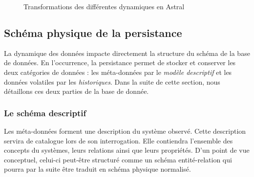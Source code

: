 \begin{figure}[ht]
    \centering
{}
\caption{Transformations des différentes dynamiques en Astral}\label{fig:contrib:asteroid:theorie:dynamics}
\end{figure}

\subsection{Schéma physique de la persistance}\label{sec:contrib:asteroid:theorie:schema}
La dynamique des données impacte directement la structure du schéma de la base de données. En l'occurrence, la persistance permet de stocker et conserver les deux catégories de données : les méta-données par le \textit{modèle descriptif} et les données volatiles par les \textit{historiques}. Dans la suite de cette section, nous détaillons ces deux parties de la base de donnée.

\subsubsection{Le schéma descriptif}
Les méta-données forment une description du système observé. Cette description servira de catalogue lors de son interrogation. Elle contiendra l'ensemble des concepts du systèmes, leurs relations ainsi que leurs propriétés. D'un point de vue conceptuel, celui-ci peut-être structuré comme un schéma entité-relation qui pourra par la suite être traduit en schéma physique normalisé.

